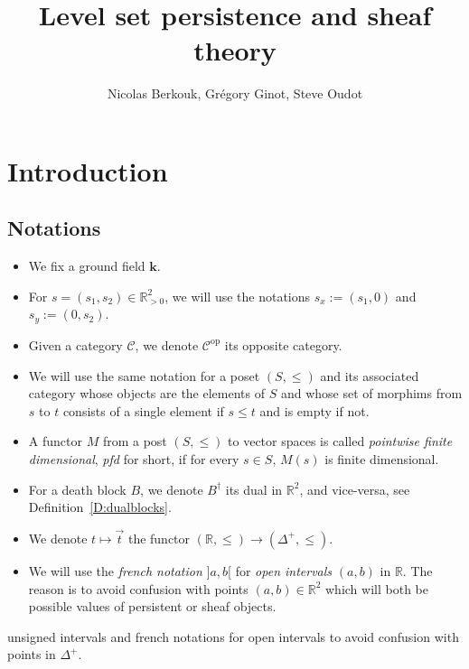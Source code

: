 \documentclass[a4paper, english, 11pt]{article}
\author{Nicolas Berkouk, Grégory Ginot, Steve Oudot}
\newcommand{\kk}[0]{\textbf{k}}
\newcommand{\0}{\vec{0}}
\newcommand{\R}[0]{\mathbb{R}}
\newcommand{\C}[0]{\mathcal{C}}
\newcommand{\op}[0]{\text{op}}
\begin{document}

\title{Level set persistence and sheaf theory}
\maketitle
\begin{abstract}
   
\end{abstract}

\tableofcontents

\section{Introduction}

\subsection{Notations}

\begin{itemize}
\item We fix a ground field $\kk$.
    \item For $s=(s_1,s_2)\in \R^2_{>0}$, we will use the notations $s_x:=(s_1,0)$ and $s_y := (0,s_2)$.
    \item Given a category $\C$, we denote $\C^{\op}$ its opposite category. 
    \item We will use the same notation for a poset $(S, \leq)$ and its associated  category whose objects are the elements of $S$ and whose set of morphims from  $s$ to $t$ consists of a single element if $s\leq t$ and is empty if not.
    \item A functor $M$ from a post $(S, \leq)$ to vector spaces is called \emph{pointwise finite dimensional}, \emph{pfd} for short, if for every $s\in S$, $M(s)$ is finite dimensional. 
    \item For a death block $B$, we denote $B^\dag$ its dual  in $\R^2$, and vice-versa, see Definition~\ref{D:dualblocks}.
    \item We denote $t\mapsto \vec{t}$ the functor $(\R ,\leq) \to (\Delta^+, \leq)$.
    \item We will use the \emph{french notation} $]a,b[$ for \emph{open intervals} $(a,b)$ in $\R$. The reason is to avoid confusion with points $(a,b)\in \R^2$ which will both be possible values of persistent or sheaf objects.
\end{itemize}

unsigned intervals and french notations for open intervals to avoid confusion with points in $\Delta^+$.
\end{document}
